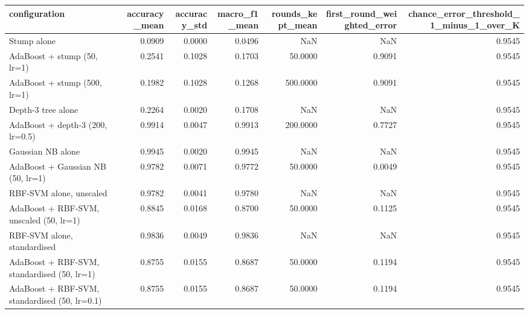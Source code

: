 \begin{tabular}{lrrrrrr}
\toprule
configuration & accuracy_mean & accuracy_std & macro_f1_mean & rounds_kept_mean & first_round_weighted_error & chance_error_threshold_1_minus_1_over_K \\
\midrule
Stump alone & 0.0909 & 0.0000 & 0.0496 & NaN & NaN & 0.9545 \\
AdaBoost + stump (50, lr=1) & 0.2541 & 0.1028 & 0.1703 & 50.0000 & 0.9091 & 0.9545 \\
AdaBoost + stump (500, lr=1) & 0.1982 & 0.1028 & 0.1268 & 500.0000 & 0.9091 & 0.9545 \\
Depth-3 tree alone & 0.2264 & 0.0020 & 0.1708 & NaN & NaN & 0.9545 \\
AdaBoost + depth-3 (200, lr=0.5) & 0.9914 & 0.0047 & 0.9913 & 200.0000 & 0.7727 & 0.9545 \\
Gaussian NB alone & 0.9945 & 0.0020 & 0.9945 & NaN & NaN & 0.9545 \\
AdaBoost + Gaussian NB (50, lr=1) & 0.9782 & 0.0071 & 0.9772 & 50.0000 & 0.0049 & 0.9545 \\
RBF-SVM alone, unscaled & 0.9782 & 0.0041 & 0.9780 & NaN & NaN & 0.9545 \\
AdaBoost + RBF-SVM, unscaled (50, lr=1) & 0.8845 & 0.0168 & 0.8700 & 50.0000 & 0.1125 & 0.9545 \\
RBF-SVM alone, standardised & 0.9836 & 0.0049 & 0.9836 & NaN & NaN & 0.9545 \\
AdaBoost + RBF-SVM, standardised (50, lr=1) & 0.8755 & 0.0155 & 0.8687 & 50.0000 & 0.1194 & 0.9545 \\
AdaBoost + RBF-SVM, standardised (50, lr=0.1) & 0.8755 & 0.0155 & 0.8687 & 50.0000 & 0.1194 & 0.9545 \\
\bottomrule
\end{tabular}
